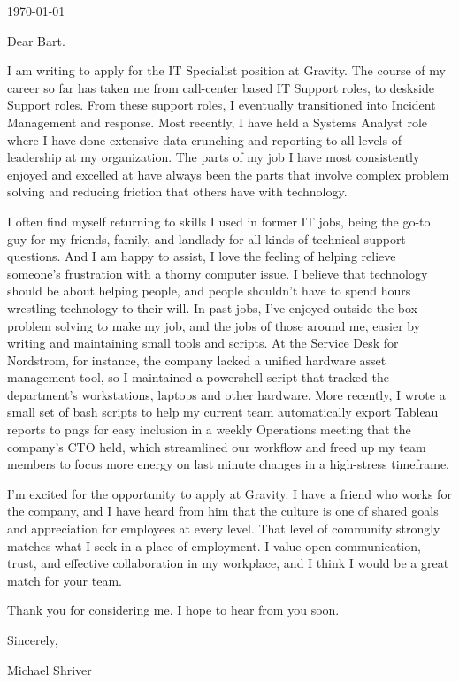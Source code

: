 \documentclass[10pt,oneside]{article}
\begin{document}
\hfill\dte\today
\heading
\vspace{\baselineskip}
\vspace{\baselineskip}

Dear Bart.

\vspace{\baselineskip}

I am writing to apply for the IT Specialist position at Gravity. The course of my career so far has taken me from call-center based IT Support roles, to deskside Support roles. From these support roles, I eventually transitioned into Incident Management and response. Most recently, I have held a Systems Analyst role where I have done extensive data crunching and reporting to all levels of leadership at my organization. The parts of my job I have most consistently enjoyed and excelled at have always been the parts that involve complex problem solving and reducing friction that others have with technology.

\vspace{\baselineskip}

I often find myself returning to skills I used in former IT jobs, being the go-to guy for my friends, family, and landlady for all kinds of technical support questions. And I am happy to assist, I love the feeling of helping relieve someone’s frustration with a thorny computer issue. I believe that technology should be about helping people, and people shouldn’t have to spend hours wrestling technology to their will. In past jobs, I’ve enjoyed outside-the-box problem solving to make my job, and the jobs of those around me, easier by writing and maintaining small tools and scripts. At the Service Desk for Nordstrom, for instance, the company lacked a unified hardware asset management tool, so I maintained a powershell script that tracked the department’s workstations, laptops and other hardware. More recently, I wrote a small set of bash scripts to help my current team automatically export Tableau reports to pngs for easy inclusion in a weekly Operations meeting that the company’s CTO held, which streamlined our workflow and freed up my team members to focus more energy on last minute changes in a high-stress timeframe.

\vspace{\baselineskip}

I’m excited for the opportunity to apply at Gravity. I have a friend who works for the company, and I have heard from him that the culture is one of shared goals and appreciation for employees at every level. That level of community strongly matches what I seek in a place of employment. I value open communication, trust, and effective collaboration in my workplace, and I think I would be a great match for your team.

\vspace{\baselineskip}

Thank you for considering me. I hope to hear from you soon.

\vspace{\baselineskip}

Sincerely,

\vspace{\baselineskip}

Michael Shriver
\end{document}
